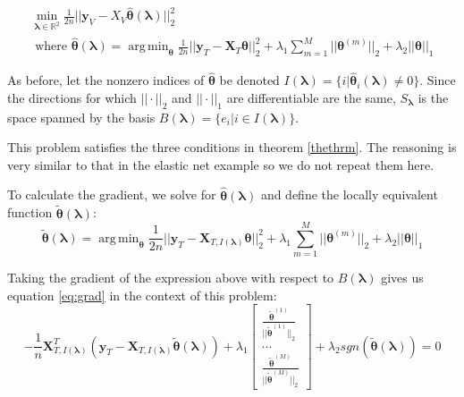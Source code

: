 \documentclass[10pt,letterpaper]{article}
\DeclareMathOperator*{\argmin}{arg\,min}
\begin{document}
\begin{equation}
\begin{array}{c}
\min_{\boldsymbol{\lambda} \in \mathbb{R}^2} \frac{1}{2n} \bigl\lvert\bigl\lvert \boldsymbol{y}_V - X_V \hat{\boldsymbol{\theta}}(\boldsymbol{\lambda}) \bigl\rvert\bigl\rvert^2_2 \\
\text{ where }
\hat{\boldsymbol{\theta}}(\boldsymbol{\lambda}) = \argmin_{\boldsymbol{\theta}} \frac{1}{2n} \bigl\lvert\bigl\lvert \boldsymbol{y}_T - \boldsymbol{X}_T \boldsymbol{\theta} \bigl\rvert\bigl\rvert^2_2
+ \lambda_1 \sum_{m=1}^M \lvert\lvert \boldsymbol\theta^{(m)} \rvert \rvert_2
+ \lambda_2 \lvert\lvert \boldsymbol\theta \rvert \rvert_1
\end{array}
\end{equation}

As before, let the nonzero indices of $\hat{\boldsymbol{\theta}}$ be denoted $I(\boldsymbol\lambda) = \{i | \hat{\boldsymbol{\theta}}_i(\boldsymbol\lambda) \ne 0\}$. Since the directions for which $||\cdot||_2$ and $||\cdot||_1$ are differentiable are the same, $S_{\boldsymbol{\lambda}}$ is the space spanned by the basis $B(\boldsymbol\lambda)=\{e_i | i \in I(\boldsymbol\lambda)\}$.

This problem satisfies the three conditions in theorem \ref{thethrm}. The reasoning is very similar to that in the elastic net example so we do not repeat them here.

To calculate the gradient, we solve for $\hat{\boldsymbol{\theta}}(\boldsymbol{\lambda})$ and define the locally equivalent function $\tilde{\boldsymbol{\theta}}(\boldsymbol{\lambda})$:
\begin{equation}
\tilde{\boldsymbol{\theta}}(\boldsymbol{\lambda}) = \argmin_{\boldsymbol\theta}
\frac{1}{2n} \bigl\lvert\bigl\lvert \boldsymbol{y}_T - \boldsymbol{X}_{T, I(\boldsymbol\lambda)} \boldsymbol{\theta} \bigl\rvert\bigl\rvert^2_2
+ \lambda_1 \sum_{m=1}^M \lvert\lvert \boldsymbol\theta^{(m)} \rvert \rvert_2
+ \lambda_2 \lvert\lvert \boldsymbol\theta \rvert \rvert_1
\end{equation}

Taking the gradient of the expression above with respect to $B(\boldsymbol\lambda)$ gives us equation \eqref{eq:grad} in the context of this problem:
\begin{equation}
-\frac{1}{n} \boldsymbol{X}_{T, I(\boldsymbol\lambda)}^T(\boldsymbol{y}_T - \boldsymbol{X}_{T, I(\boldsymbol\lambda)} \tilde{\boldsymbol\theta}(\boldsymbol \lambda))
+ \lambda_1
\begin{bmatrix}
\frac{\tilde{\boldsymbol{\theta}}^{(1)}}{||\tilde{\boldsymbol{\theta}}^{(1)}||_2}\\
...\\
\frac{\tilde{\boldsymbol\theta}^{(M)}}{||\tilde{\boldsymbol{\theta}}^{(M)}||_2}
\end{bmatrix}
+ \lambda_2 sgn(\tilde{\boldsymbol\theta}(\boldsymbol \lambda)) =0
\end{equation}
\end{document}
